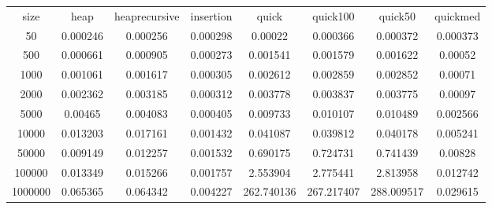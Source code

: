 \begin{table}
\begin{tabular}{cccccccc}
size & heap & heaprecursive & insertion & quick & quick100 & quick50 & quickmed \\
50 & 0.000246 & 0.000256 & 0.000298 & 0.00022 & 0.000366 & 0.000372 & 0.000373 \\
500 & 0.000661 & 0.000905 & 0.000273 & 0.001541 & 0.001579 & 0.001622 & 0.00052 \\
1000 & 0.001061 & 0.001617 & 0.000305 & 0.002612 & 0.002859 & 0.002852 & 0.00071 \\
2000 & 0.002362 & 0.003185 & 0.000312 & 0.003778 & 0.003837 & 0.003775 & 0.00097 \\
5000 & 0.00465 & 0.004083 & 0.000405 & 0.009733 & 0.010107 & 0.010489 & 0.002566 \\
10000 & 0.013203 & 0.017161 & 0.001432 & 0.041087 & 0.039812 & 0.040178 & 0.005241 \\
50000 & 0.009149 & 0.012257 & 0.001532 & 0.690175 & 0.724731 & 0.741439 & 0.00828 \\
100000 & 0.013349 & 0.015266 & 0.001757 & 2.553904 & 2.775441 & 2.813958 & 0.012742 \\
1000000 & 0.065365 & 0.064342 & 0.004227 & 262.740136 & 267.217407 & 288.009517 & 0.029615 \\
\end{tabular}
\end{table}
